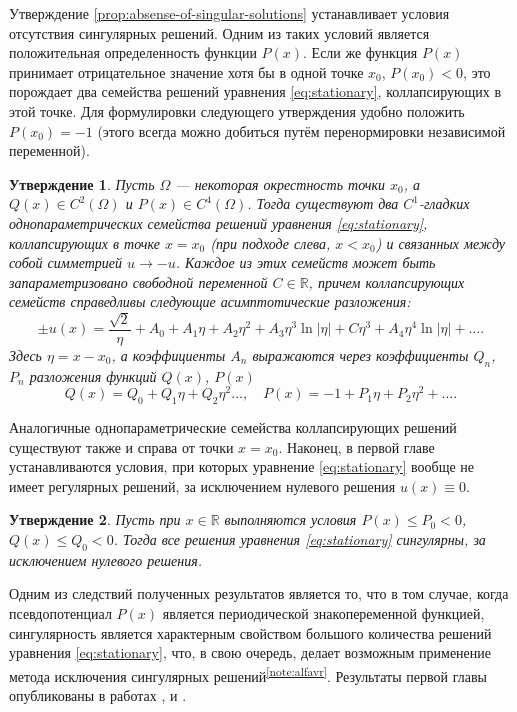 \documentclass[candidate, href, colorlinks]{disser}
\newtheorem{proposition}{Утверждение}
\begin{document}
Утверждение \ref{prop:absense-of-singular-solutions} устанавливает условия отсутствия сингулярных решений.
Одним из таких условий является положительная определенность функции $P(x)$.
Если же функция $P(x)$ принимает отрицательное значение хотя бы в одной точке $x_0$, $P(x_0) < 0$, это порождает два семейства решений уравнения \eqref{eq:stationary}, коллапсирующих в этой точке.
Для формулировки следующего утверждения удобно положить $P(x_0) = -1$ (этого всегда можно добиться путём перенормировки независимой переменной).

\begin{proposition}
\label{prop:singular-families}
	Пусть $\Omega$ --- некоторая окрестность точки $x_0$, а $Q(x) \in C^2(\Omega)$ и $P(x) \in C^4(\Omega)$.
	Тогда существуют два $C^1$-гладких однопараметрических семейства решений уравнения \eqref{eq:stationary}, коллапсирующих в точке $x = x_0$ (при подходе слева, $x < x_0$) и связанных между собой симметрией $u \to -u$.
	Каждое из этих семейств может быть запараметризовано свободной переменной $C \in \mathbb{R}$, причем коллапсирующих семейств справедливы следующие асимптотические разложения:
	\begin{equation}
		\pm u(x) = \dfrac{\sqrt{2}}{\eta} + A_0 + A_1 \eta + A_2 \eta^2 + A_3 \eta^3 \ln |\eta| + C \eta^3+ A_4 \eta^4 \ln |\eta| + \dots.
	\label{eq:expansion}
	\end{equation}
	Здесь $\eta = x - x_0$, а коэффициенты $A_n$ выражаются через коэффициенты $Q_n$, $P_n$ разложения функций $Q(x)$, $P(x)$
	\begin{equation}
		Q(x) = Q_0 + Q_1 \eta + Q_2 \eta^2 \dots, \quad P(x) = -1 + P_1 \eta + P_2 \eta^2 + \dots.
	\end{equation}
\end{proposition}

Аналогичные однопараметрические семейства коллапсирующих решений существуют также и справа от точки $x = x_0$.
Наконец, в первой главе устанавливаются условия, при которых уравнение \eqref{eq:stationary} вообще не имеет регулярных решений, за исключением нулевого решения $u(x) \equiv 0$.

\begin{proposition}
\label{prop:all-solutions-are-singular}
 	Пусть при $x \in \mathbb{R}$ выполняются условия $P(x) \le P_0 < 0$, $Q(x) \le Q_0 < 0$.
 	Тогда все решения уравнения \eqref{eq:stationary} сингулярны, за исключением нулевого решения.
\end{proposition}

Одним из следствий полученных результатов является то, что в том случае, когда псевдопотенциал $P(x)$ является периодической знакопеременной функцией, сингулярность является характерным свойством большого количества решений уравнения \eqref{eq:stationary}, что, в свою очередь, делает возможным применение метода исключения сингулярных решений\textsuperscript{\ref{note:alfavr}}.
Результаты первой главы опубликованы в работах \cite{AlfimovLebedev}, \cite{NizhniNovgorod2014} и \cite{Ufa2015}.
\end{document}
